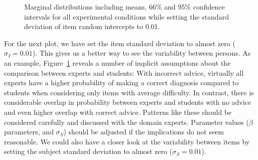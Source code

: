 \documentclass[
  man,
  floatsintext,
  longtable,
  a4paper,
  nolmodern,
  notxfonts,
  notimes,
  colorlinks=true,linkcolor=blue,citecolor=blue,urlcolor=blue]{apa7}
\begin{document}
\label{cell-fig-margdist2}
\begin{figure}[H]

\caption{\label{fig-margdist2}Marginal distributions including means,
66\% and 95\% confidence intervals for all experimental conditions while
setting the standard deviation of item random intercepts to 0.01.}


\end{figure}%

For the next plot, we have set the item standard deviation to almost
zero (\(\sigma_I = 0.01\)). This gives us a better way to see the
variability between persons. As an example, Figure~\ref{fig-margdist2}
reveals a number of implicit assumptions about the comparison between
experts and students: With incorrect advice, virtually all experts have
a higher probability of making a correct diagnosis compared to students
when considering only items with average difficulty. In contrast, there
is considerable overlap in probability between experts and students with
no advice and even higher overlap with correct advice. Patterns like
these should be considered carefully and discussed with the domain
experts. Parameter values (\(\beta\) parameters, and \(\sigma_S\))
should be adjusted if the implications do not seem reasonable. We could
also have a closer look at the variability between items by setting the
subject standard deviation to almost zero (\(\sigma_S = 0.01\)).
\end{document}
